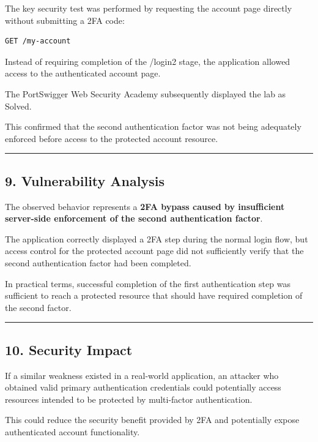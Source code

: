 \documentclass[
]{article}
\begin{document}
The key security test was performed by requesting the account page
directly without submitting a 2FA code:

\begin{verbatim}
GET /my-account
\end{verbatim}

Instead of requiring completion of the /login2 stage, the application
allowed access to the authenticated account page.

The PortSwigger Web Security Academy subsequently displayed the lab as
Solved.

This confirmed that the second authentication factor was not being
adequately enforced before access to the protected account resource.

\begin{center}\rule{0.5\linewidth}{0.5pt}\end{center}

\subsection{9. Vulnerability Analysis}\label{vulnerability-analysis}

The observed behavior represents a \textbf{2FA bypass caused by
insufficient server-side enforcement of the second authentication
factor}.

The application correctly displayed a 2FA step during the normal login
flow, but access control for the protected account page did not
sufficiently verify that the second authentication factor had been
completed.

In practical terms, successful completion of the first authentication
step was sufficient to reach a protected resource that should have
required completion of the second factor.

\begin{center}\rule{0.5\linewidth}{0.5pt}\end{center}

\subsection{10. Security Impact}\label{security-impact}

If a similar weakness existed in a real-world application, an attacker
who obtained valid primary authentication credentials could potentially
access resources intended to be protected by multi-factor
authentication.

This could reduce the security benefit provided by 2FA and potentially
expose authenticated account functionality.
\end{document}
